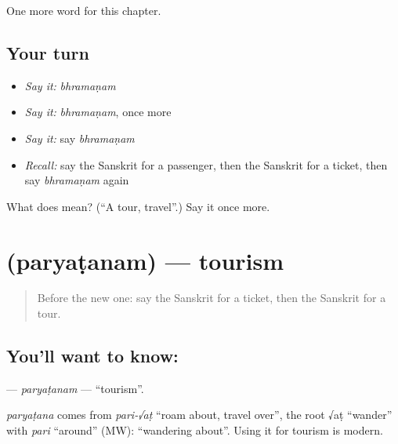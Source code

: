 \begin{grammarlens}[title={What you've built}]
One more word for this chapter.
\end{grammarlens}

\subsection*{Your turn}
\begin{itemize}
\raggedright
  \item \emph{Say it:} \emph{bhramaṇam}
  \item \emph{Say it:} \emph{bhramaṇam}, once more
  \item \emph{Say it:} say \emph{bhramaṇam}
  \item \emph{Recall:} say the Sanskrit for a passenger, then the Sanskrit for a ticket, then say \emph{bhramaṇam} again
\end{itemize}

\begin{tcolorbox}[breakable,colback=teal!4,colframe=teal!35!black,title={Before you move on}]
What does  mean? (\textquotedblleft{}A tour, travel\textquotedblright{}.) Say it once more.
\end{tcolorbox}
\section[\texorpdfstring{\sk{पर्यटनम्} (paryaṭanam)}{पर्यटनम् (paryaṭanam)}]{ (paryaṭanam) — tourism}

\label{lesson:SA-C172-paryatanam}



\begin{quote}
Before the new one: say the Sanskrit for a ticket, then the Sanskrit for a tour.
\end{quote}

\subsection*{You'll want to know: }
\textbf{} — \emph{paryaṭanam} — \textquotedblleft{}tourism\textquotedblright{}.

\begin{cousinweb}
\emph{paryaṭana} comes from \emph{pari-√aṭ} \textquotedblleft{}roam about, travel over\textquotedblright{}, the root √aṭ \textquotedblleft{}wander\textquotedblright{} with \emph{pari} \textquotedblleft{}around\textquotedblright{} (MW): \textquotedblleft{}wandering about\textquotedblright{}. Using it for tourism is modern.
\end{cousinweb}

